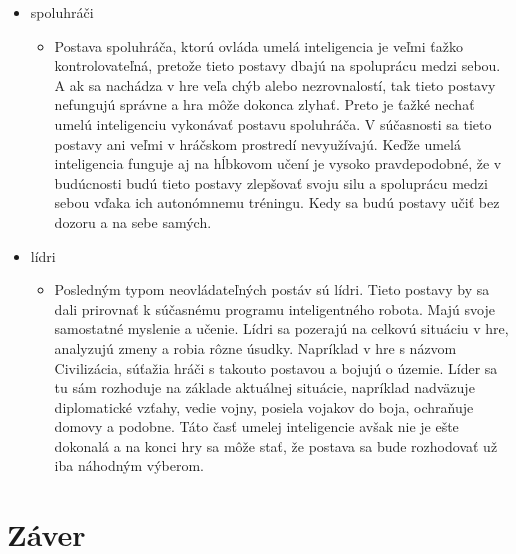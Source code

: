 \documentclass[10pt,twoside,slovak,a4paper]{article}
\begin{document}
\begin{itemize}
\begin{itemize}
	\end{itemize}
\item spoluhráči
	\begin{itemize}
	\item Postava spoluhráča, ktorú ovláda umelá inteligencia je veľmi ťažko kontrolovateľná, pretože tieto postavy dbajú na spoluprácu medzi sebou. A ak sa nachádza v hre veľa chýb alebo nezrovnalostí, tak tieto postavy nefungujú správne a hra môže dokonca zlyhať. Preto je ťažké nechať umelú inteligenciu vykonávať postavu spoluhráča. V súčasnosti sa tieto postavy ani veľmi v hráčskom prostredí nevyužívajú. Keďže umelá inteligencia funguje aj na hĺbkovom učení je vysoko pravdepodobné, že v budúcnosti budú tieto postavy zlepšovať svoju silu a spoluprácu medzi sebou vďaka ich autonómnemu tréningu. Kedy sa budú postavy učiť bez dozoru a na sebe samých. 
	\end{itemize}
\item lídri
	\begin{itemize}
	\item Posledným typom neovládateľných postáv sú lídri. Tieto postavy by sa dali prirovnať k súčasnému programu inteligentného robota. Majú svoje samostatné myslenie a učenie. Lídri sa pozerajú na celkovú situáciu v hre, analyzujú zmeny a robia rôzne úsudky. Napríklad v hre s názvom Civilizácia, súťažia hráči s takouto postavou a bojujú o územie. Líder sa tu sám rozhoduje na základe aktuálnej situácie, napríklad nadväzuje diplomatické vzťahy, vedie vojny, posiela vojakov do boja, ochraňuje domovy a podobne. Táto časť umelej inteligencie avšak nie je ešte dokonalá a na konci hry sa môže stať, že postava sa bude rozhodovať už iba náhodným výberom. 
	\end{itemize}
\end{itemize}

\section{Záver} \label{zaver} %







%
\end{document}
